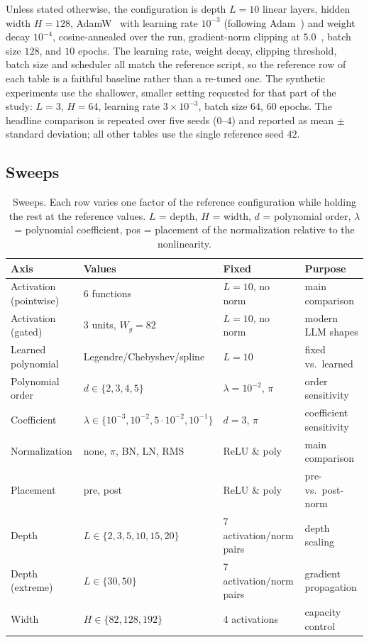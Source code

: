 Unless stated otherwise, the configuration is depth $L = 10$ linear layers,
hidden width $H = 128$, AdamW~\citep{loshchilov2019decoupled} with learning
rate $10^{-3}$ (following
Adam~\citep{kingma2015adam}) and weight decay
$10^{-4}$, cosine-annealed over the run, gradient-norm
clipping at $5.0$~\citep{pascanu2013difficulty},
batch size $128$, and $10$ epochs. The learning rate, weight decay, clipping
threshold, batch size and scheduler all match the reference script, so the
reference row of each table is a faithful baseline rather than a re-tuned one.
The synthetic experiments use the shallower, smaller setting requested for
that part of the study: $L = 3$, $H = 64$, learning rate $3\times 10^{-3}$,
batch size $64$, $60$ epochs. The headline comparison is repeated over five
seeds ($0$--$4$) and reported as mean $\pm$ standard deviation; all other
tables use the single reference seed $42$.

\subsection{Sweeps}

\begin{table}[t]
\centering
\caption{Sweeps. Each row varies one factor of the reference configuration
while holding the rest at the reference values. $L$ = depth, $H$ = width,
$d$ = polynomial order, $\lambda$ = polynomial coefficient, pos = placement
of the normalization relative to the nonlinearity.}
\label{tab:sweeps}
\small
\begin{tabular}{@{}llll@{}}
\toprule
Axis & Values & Fixed & Purpose \\
\midrule
Activation (pointwise) & 6 functions & $L{=}10$, no norm & main comparison \\
Activation (gated) & 3 units, $W_g{=}82$ & $L{=}10$, no norm & modern LLM shapes \\
Learned polynomial & Legendre/Chebyshev/spline & $L{=}10$ & fixed vs.\ learned \\
Polynomial order & $d \in \{2,3,4,5\}$ & $\lambda{=}10^{-2}$, $\pi$ & order sensitivity \\
Coefficient & $\lambda \in \{10^{-3},10^{-2},5{\cdot}10^{-2},10^{-1}\}$ & $d{=}3$, $\pi$ & coefficient sensitivity \\
Normalization & none, $\pi$, BN, LN, RMS & ReLU \& poly & main comparison \\
Placement & pre, post & ReLU \& poly & pre- vs.\ post-norm \\
Depth & $L \in \{2,3,5,10,15,20\}$ & 7 activation/norm pairs & depth scaling \\
Depth (extreme) & $L \in \{30,50\}$ & 7 activation/norm pairs & gradient propagation \\
Width & $H \in \{82,128,192\}$ & 4 activations & capacity control \\
\bottomrule
\end{tabular}
\end{table}

